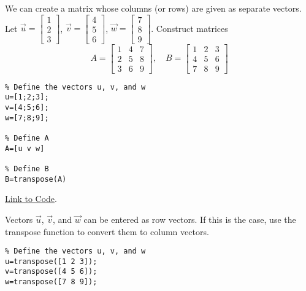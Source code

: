 \documentclass{ximera}
\begin{document}
\begin{template}\label{temp:colRow}
    We can create a matrix whose columns (or rows) are given as separate vectors.
    Let $\vec{u}=\begin{bmatrix}1\\2\\3\end{bmatrix}$, $\vec{v}=\begin{bmatrix}4\\5\\6\end{bmatrix}$, $\vec{w}=\begin{bmatrix}7\\8\\9\end{bmatrix}$.  Construct matrices
    $$A=\begin{bmatrix}1 & 4 &7\\2 & 5 & 8\\3 & 6 & 9\end{bmatrix},\quad B=\begin{bmatrix}1 & 2 & 3\\4 & 5 & 6\\7 & 8 & 9\end{bmatrix}$$

    \begin{verbatim}
% Define the vectors u, v, and w
u=[1;2;3];
v=[4;5;6];
w=[7;8;9];

% Define A
A=[u v w]

% Define B
B=transpose(A)
    \end{verbatim}

\href{https://sagecell.sagemath.org/?z=eJxTVXBJTcvMS1UoyUhVKEtNLskvKlYo1VEo01FIzEtRKOflKrWNNrQ2sjaOteblKrONNrE2tTYDsctto82tLawtQWxeLlWYOY68XI620aUKZQrlsSgSTrxcTrYlRYl5xQX5xakajpoAN80hMA==&lang=octave&interacts=eJyLjgUAARUAuQ==}{Link to Code}.
\begin{remark}
    Vectors $\vec{u}$, $\vec{v}$, and $\vec{w}$ can be entered as row vectors.  If this is the case, use the transpose function to convert them to column vectors.
    \begin{verbatim}
% Define the vectors u, v, and w
u=transpose([1 2 3]);
v=transpose([4 5 6]);
w=transpose([7 8 9]);
    \end{verbatim}
\end{remark}
\end{template}
\end{document}
